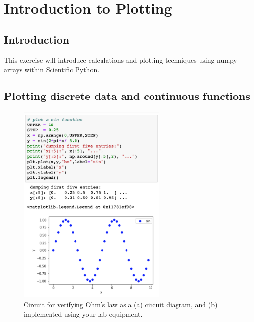 \chapter{Introduction to Plotting}

\section{Introduction}
This exercise will introduce calculations and plotting techniques using
numpy arrays within Scientific Python.

\section{Plotting discrete data and continuous functions}

\begin{figure}[htbp]
\begin{center}
\includegraphics[width=0.65\textwidth]{figs//plotting/plotting.png} 
\caption{Circuit for verifying Ohm's law as a (a) circuit diagram, and (b) implemented using your lab equipment.}
\label{fig:plotsin}
\end{center}
\end{figure}


